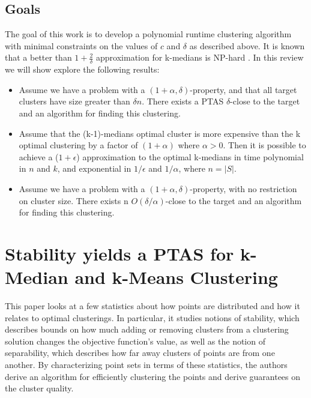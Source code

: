 \documentclass[paper=a4, fontsize=10.5pt]{scrartcl} %
\numberwithin{equation}{section} %
\numberwithin{figure}{section} %
\numberwithin{table}{section} %
\begin{document}
\subsection{Goals}

The goal of this work is to develop a polynomial runtime clustering algorithm with minimal constraints on the values of $c$ and $\delta$ as described above. It is known that a better than $1 + \frac{2}{\delta}$ approximation for k-medians is NP-hard \cite{JMS02}. In this review we will show explore the following results:

\begin{itemize}

\item Assume we have a problem with a $(1+\alpha, \delta)$-property, and that all target clusters have size greater than $\delta n$. There exists a PTAS $\delta$-close to the target and an algorithm for finding this clustering.

\item Assume that the (k-1)-medians optimal cluster is more expensive than the k optimal clustering by a factor of $(1+\alpha)$ where $\alpha > 0$. Then it is possible to achieve a ($1+\epsilon$) approximation to the optimal k-medians in time polynomial in $n$ and $k$, and exponential in $1/\epsilon$ and $1/\alpha$, where $n = |S|$.

\item Assume we have a problem with a $(1+\alpha, \delta)$-property, with no restriction on cluster size. There exists n $O(\delta/\alpha)$-close to the target and an algorithm for finding this clustering.
\end{itemize}


\section{Stability yields a PTAS for k-Median and k-Means Clustering}

This paper looks at a few statistics about how points are distributed and how it relates to optimal clusterings.  In particular, it studies notions of stability, which describes bounds on how much adding or removing clusters from a clustering solution changes the objective function's value, as well as the notion of separability, which describes how far away clusters of points are from one another.  By characterizing point sets in terms of these statistics, the authors derive an algorithm for efficiently clustering the points and derive guarantees on the cluster quality.
\end{document}
